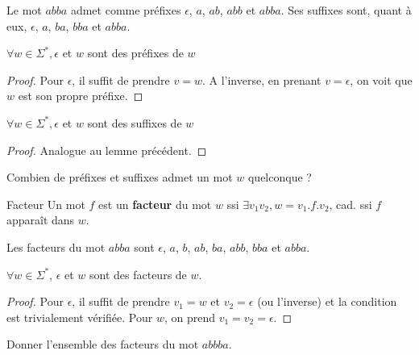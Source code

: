 \begin{example}
Le mot $abba$ admet comme préfixes $\epsilon$, $a$, $ab$, $abb$ et $abba$. Ses suffixes sont, quant à eux, $\epsilon$, $a$, $ba$, $bba$ et $abba$.
\end{example}

\begin{lemma}
$\forall w \in \Sigma^*, \epsilon$ et $w$ sont des préfixes de $w$
\end{lemma}
 
\begin{proof}
Pour $\epsilon$, il suffit de prendre $v = w$. A l'inverse, en prenant $v = \epsilon$, on voit que $w$ est son propre préfixe.
\end{proof}

\begin{lemma}
$\forall w \in \Sigma^*, \epsilon$ et $w$ sont des suffixes de $w$
\end{lemma}

\begin{proof}
Analogue au lemme précédent.
\end{proof}


\begin{exercice}\label{expref}
Combien de préfixes et suffixes admet un mot $w$ quelconque ?
\end{exercice}

\begin{definition}{Facteur}{}
Un mot $f$ est un \textbf{facteur} du mot $w$ ssi $\exists v_1 v_2, w = v_1.f.v_2$, cad. ssi $f$ apparaît dans $w$.
\end{definition}

\begin{example}
Les facteurs du mot $abba$ sont $\epsilon$, $a$, $b$, $ab$, $ba$, $abb$, $bba$ et $abba$. 
\end{example}

\begin{lemma}
$\forall w \in \Sigma^*$, $\epsilon$ et $w$ sont des facteurs de $w$.
\end{lemma}

\begin{proof}
Pour $\epsilon$, il suffit de prendre $v_1 = w$ et $v_2 = \epsilon$ (ou l'inverse) et la condition est trivialement vérifiée. Pour $w$, on prend $v_1 = v_2 = \epsilon$.
\end{proof}

\begin{exercice}
Donner l'ensemble des facteurs du mot $abbba$.
\end{exercice}

